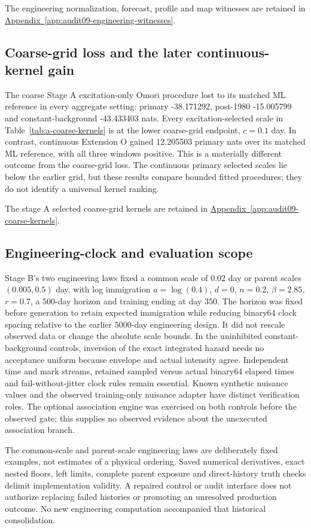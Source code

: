 \noindent The engineering normalization, forecast, profile and map witnesses are retained in \hyperref[app:audit09-engineering-witnesses]{Appendix~\ref{app:audit09-engineering-witnesses}}.

\subsection{Coarse-grid loss and the later continuous-kernel gain}
The coarse Stage A excitation-only Omori procedure lost to its matched ML
reference in every aggregate setting: primary -38.171292, post-1980 -15.005799 and constant-background -43.433403 nats.
Every excitation-selected scale in Table~\ref{tab:a-coarse-kernels} is at the
lower coarse-grid endpoint, $c=0.1$ day. In contrast, continuous Extension O
gained 12.205503 primary nats over its matched ML reference, with all three windows positive.
This is a materially different outcome from the coarse-grid loss. The continuous
primary selected scales lie below the earlier grid, but these results compare
bounded fitted procedures; they do not identify a universal kernel ranking.

\noindent The stage A selected coarse-grid kernels are retained in \hyperref[app:audit09-coarse-kernels]{Appendix~\ref{app:audit09-coarse-kernels}}.

\subsection{Engineering-clock and evaluation scope}
Stage B's two engineering laws fixed a common scale of $0.02$ day or parent
scales $(0.005,0.5)$ day, with log immigration $a=\log(0.4)$, $d=0$,
$n=0.2$, $\beta=2.85$, $r=0.7$, a $500$-day horizon and training ending at
day $350$. The horizon was fixed before generation to retain expected
immigration while reducing binary64 clock spacing relative to the earlier
$5000$-day engineering design. It did not rescale observed data or change the
absolute scale bounds. In the uninhibited constant-background controls,
inversion of the exact integrated hazard needs no acceptance uniform because
envelope and actual intensity agree. Independent time and mark streams,
retained sampled versus actual binary64 elapsed times and fail-without-jitter
clock rules remain essential. Known synthetic nuisance values and the observed
training-only nuisance adapter have distinct verification roles. The optional
association engine was exercised on both controls before the observed gate;
this supplies no observed evidence about the unexecuted association branch.

The common-scale and parent-scale engineering laws are deliberately fixed
examples, not estimates of a physical ordering. Saved numerical derivatives,
exact nested floors, left limits, complete parent exposure and direct-history
truth checks delimit implementation validity. A repaired control or audit
interface does not authorize replacing failed histories or promoting an
unresolved production outcome. No new engineering computation accompanied
that historical consolidation.


